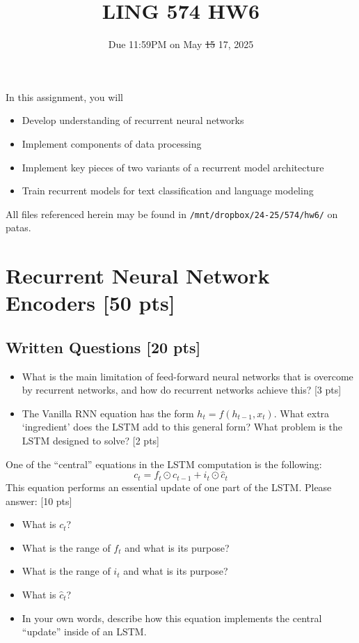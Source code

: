 \documentclass[11pt]{article}
\begin{document}
\title{LING 574 HW6}
\date{\vspace{-0.2in}Due 11:59PM on May \sout{15} 17, 2025}
\maketitle


\noindent In this assignment, you will 
\begin{itemize}
  \item Develop understanding of recurrent neural networks
  \item Implement components of data processing 
  \item Implement key pieces of two variants of a recurrent model architecture
  \item Train recurrent models for text classification and language modeling
\end{itemize}
All files referenced herein may be found in \texttt{/mnt/dropbox/24-25/574/hw6/} on patas.


\section{Recurrent Neural Network Encoders [50 pts]}

\subsection{Written Questions [20 pts]}

\begin{itemize}
  \item What is the main limitation of feed-forward neural networks that is overcome by recurrent networks, and how do recurrent networks achieve this? \hfill [3 pts]
  \item The Vanilla RNN equation has the form $h_t = f(h_{t-1}, x_t)$.  What extra `ingredient' does the LSTM add to this general form?  What problem is the LSTM designed to solve? \hfill [2 pts]
\end{itemize}

\vspace{2em}
  One of the ``central'' equations in the LSTM computation is the following:
\[ c_t = f_t \odot c_{t-1} + i_t \odot \hat{c}_t \]
This equation performs an essential update of one part of the LSTM.  Please answer: \hfill [10 pts]
\begin{itemize}
  \item What is $c_t$?
  \item What is the range of $f_t$ and what is its purpose?
  \item What is the range of $i_t$ and what is its purpose?
  \item What is $\hat{c}_t$?
  \item In your own words, describe how this equation implements the central ``update'' inside of an LSTM.
\end{itemize}
\end{document}
